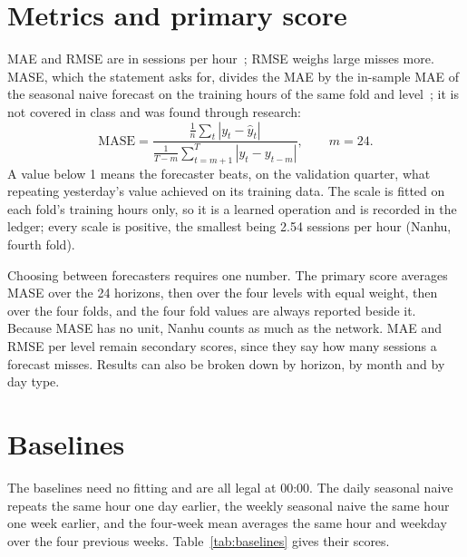 \documentclass[12pt,a4paper,openany]{report}
\begin{document}
\section{Metrics and primary score}\label{sec:metrics}

\ac{MAE} and \ac{RMSE} are in sessions per hour~\cite{mindd04}; \ac{RMSE} weighs large misses more. \ac{MASE}, which
the statement asks for, divides the \ac{MAE} by the in-sample \ac{MAE} of the seasonal naive forecast on the
training hours of the same fold and level~\cite{hyndman2006}; it is not covered in class and was found through
research:
\[
  \text{MASE} = \frac{\frac{1}{n}\sum_{t} |y_t - \hat{y}_t|}{\frac{1}{T-m}\sum_{t=m+1}^{T} |y_t - y_{t-m}|},
  \qquad m = 24 .
\]
A value below 1 means the forecaster beats, on the validation quarter, what repeating yesterday's value achieved on
its training data. The scale is fitted on each fold's training hours only, so it is a learned operation and is
recorded in the ledger; every scale is positive, the smallest being 2.54 sessions per hour (Nanhu, fourth fold).

Choosing between forecasters requires one number. The primary score averages \ac{MASE} over the 24 horizons, then
over the four levels with equal weight, then over the four folds, and the four fold values are always reported
beside it. Because \ac{MASE} has no unit, Nanhu counts as much as the network. \ac{MAE} and \ac{RMSE} per level
remain secondary scores, since they say how many sessions a forecast misses. Results can also be broken down by
horizon, by month and by day type.

\section{Baselines}\label{sec:baselines}

The baselines need no fitting and are all legal at 00:00. The daily seasonal naive repeats the same hour one day
earlier, the weekly seasonal naive the same hour one week earlier, and the four-week mean averages the same hour and
weekday over the four previous weeks. Table~\ref{tab:baselines} gives their scores.
\end{document}
